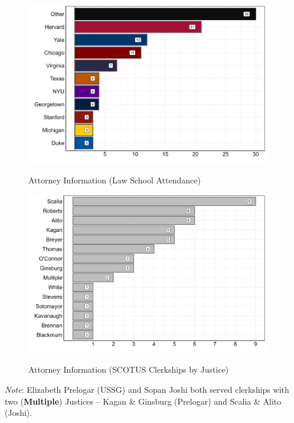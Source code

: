 \begin{landscape}
\vspace*{\fill}
\begin{figure}[h]
\centering
\caption{Attorney Information (Law School Attendance)}
\vspace{2.5mm}
\includegraphics[width=0.95\textwidth]{Figures/statpack_figures/law_school_figure.png} \\
\end{figure}
\vfill
\end{landscape}

\newpage

\begin{landscape}
\vspace*{\fill}
\vspace{2.5mm}
\begin{figure}[h]
\centering
\caption{Attorney Information (SCOTUS Clerkships by Justice)}
\vspace{2.5mm}
\includegraphics[width=0.95\textwidth]{Figures/statpack_figures/clerkships_by_justice.png} \\
\end{figure}
\vspace{2.5mm}
\footnotesize{\emph{Note}: Elizabeth Prelogar (USSG) and Sopan Joshi both served clerkships with two (\textbf{Multiple}) Justices -- Kagan \& Ginsburg (Prelogar) and Scalia \& Alito (Joshi).}
\vfill
\end{landscape}
